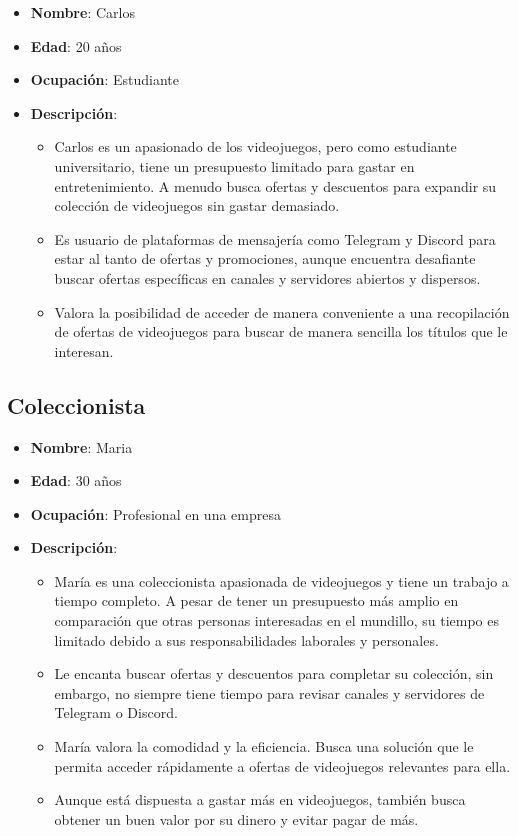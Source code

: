 \begin{itemize}
    \item \textbf{Nombre}: Carlos
    \item \textbf{Edad}: 20 años
    \item \textbf{Ocupación}: Estudiante
    \item \textbf{Descripción}:
    \begin{itemize}
        \item Carlos es un apasionado de los videojuegos, pero como estudiante 
        universitario, tiene un presupuesto limitado para gastar en 
        entretenimiento. A menudo busca ofertas y descuentos para expandir su 
        colección de videojuegos sin gastar demasiado.
        \item Es usuario de plataformas de mensajería como Telegram y Discord para 
        estar al tanto de ofertas y promociones, aunque encuentra desafiante buscar 
        ofertas específicas en canales y servidores abiertos y dispersos.
        \item Valora la posibilidad de acceder de manera conveniente a una 
        recopilación de ofertas de videojuegos para buscar de manera sencilla los 
        títulos que le interesan.
    \end{itemize}
\end{itemize}

\subsection{Coleccionista}

\begin{itemize}
    \item \textbf{Nombre}: Maria
    \item \textbf{Edad}: 30 años
    \item \textbf{Ocupación}: Profesional en una empresa
    \item \textbf{Descripción}:
    \begin{itemize}
        \item María es una coleccionista apasionada de videojuegos y tiene un 
        trabajo a tiempo completo. A pesar de tener un presupuesto más amplio en 
        comparación que otras personas interesadas en el mundillo, su tiempo es 
        limitado debido a sus responsabilidades laborales y personales.
        \item Le encanta buscar ofertas y descuentos para completar su colección, 
        sin embargo, no siempre tiene tiempo para revisar canales y servidores de 
        Telegram o Discord.
        \item María valora la comodidad y la eficiencia. Busca una solución que le 
        permita acceder rápidamente a ofertas de videojuegos relevantes para ella.
        \item Aunque está dispuesta a gastar más en videojuegos, también busca 
        obtener un buen valor por su dinero y evitar pagar de más.
    \end{itemize}
\end{itemize}

